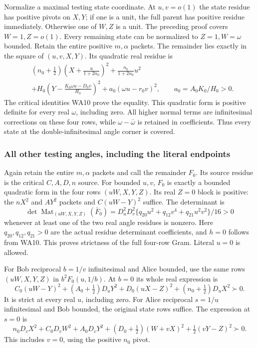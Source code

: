 Normalize a maximal testing state coordinate. At \(u,v=o(1)\)
the state residue has positive pivots on \(X,Y\); if one is a unit,
the full parent has positive residue immediately. Otherwise one
of \(W,Z\) is a unit. The preceding proof covers \(W=1,Z=o(1)\).
Every remaining state can be normalized to \(Z=1,W=\omega\)
bounded. Retain the entire positive \(m,\alpha\) packets.
The remainder lies exactly in the square of \((u,v,X,Y)\).
Its quadratic real residue is
\[
\begin{aligned}
 &(n_0+\tfrac12)\left(X+\frac{u}{1+2n_0}\right)^2
     +\frac{n_0}{1+2n_0}u^2\\
 &+H_0\left(Y-\frac{K_0\omega u-D_0v}{H_0}\right)^2
     +a_0(\omega u-r_0v)^2,\qquad a_0=A_0K_0/H_0>0 .
\end{aligned}\tag{WA22}
\]
The critical identities WA10 prove the equality. This quadratic
form is positive definite for every real \(\omega\), including zero.
All higher normal terms are infinitesimal corrections on these
four rows, while \(\omega-\bar\omega\) is retained in coefficients.
Thus every state at the double-infinitesimal angle corner is covered.

\subsubsection*{All other testing angles, including the literal endpoints}

Again retain the entire \(m,\alpha\) packets and call the remainder
\(F_0\). Its source residue is the critical \(C,A,D,n\) source.
For bounded \(u,v\), \(F_0\) is exactly a bounded quadratic form
in the four rows \((uW,X,Y,Z)\). Its real \(Z=0\) block is positive:
the \(nX^2\) and \(AY^2\) packets and \(C(uW-Y)^2\) suffice.
The determinant is
\[
 \det \operatorname{Mat}_{(uW,X,Y,Z)}(\bar F_0)
 =D_u^2D_v^2\{q_{20}u^2+q_{12}v^4+q_{21}u^2v^2\}/16>0
 \tag{WA23}
\]
whenever at least one of the two real angle residues is nonzero.
Here \(q_{20},q_{12},q_{21}>0\) are the actual residue determinant
coefficients, and \(h=0\) follows from WA10. This proves strictness
of the full four-row Gram. Literal \(u=0\) is allowed.

For Bob reciprocal \(b=1/v\) infinitesimal and Alice bounded,
use the same rows \((uW,X,Y,Z)\) in \(b^2F_0(u,1/b)\).
At \(b=0\) its whole real expression is
\[
 C_0(uW-Y)^2+(A_0+\tfrac12)D_uY^2
             +D_0(uX-Z)^2+(n_0+\tfrac12)D_uX^2\succ0 .
 \tag{WA24}
\]
It is strict at every real \(u\), including zero.
For Alice reciprocal \(s=1/u\) infinitesimal and Bob bounded,
the original state rows suffice. The expression at \(s=0\) is
\[
 n_0D_vX^2+C_0D_vW^2+A_0D_vY^2
          +(D_0+\tfrac12)(W+vX)^2+\tfrac12(vY-Z)^2\succ0 .
 \tag{WA25}
\]
This includes \(v=0\), using the positive \(n_0\) pivot.

